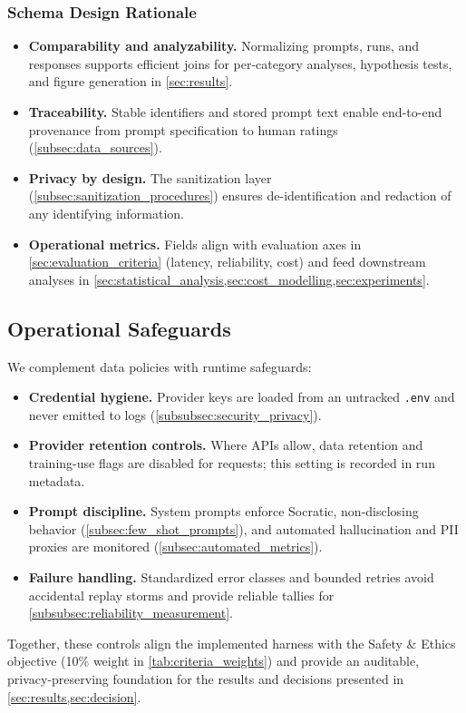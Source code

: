\subsubsection{Schema Design Rationale}\label{subsubsec:schema_rationale}

\begin{itemize}
\item \textbf{Comparability and analyzability.} Normalizing prompts, runs, and responses supports efficient joins for per-category analyses, hypothesis tests, and figure generation in \cref{sec:results}.
\item \textbf{Traceability.} Stable identifiers and stored prompt text enable end-to-end provenance from prompt specification to human ratings (\cref{subsec:data_sources}).
\item \textbf{Privacy by design.} The sanitization layer (\cref{subsec:sanitization_procedures}) ensures de-identification and redaction of any identifying information.
\item \textbf{Operational metrics.} Fields align with evaluation axes in \cref{sec:evaluation_criteria} (latency, reliability, cost) and feed downstream analyses in \cref{sec:statistical_analysis,sec:cost_modelling,sec:experiments}.
\end{itemize}

\subsection{Operational Safeguards}\label{subsec:operational_safeguards}

We complement data policies with runtime safeguards:

\begin{itemize}
\item \textbf{Credential hygiene.} Provider keys are loaded from an untracked \verb|.env| and never emitted to logs (\cref{subsubsec:security_privacy}).
\item \textbf{Provider retention controls.} Where APIs allow, data retention and training-use flags are disabled for requests; this setting is recorded in run metadata.
\item \textbf{Prompt discipline.} System prompts enforce Socratic, non-disclosing behavior (\cref{subsec:few_shot_prompts}), and automated hallucination and PII proxies are monitored (\cref{subsec:automated_metrics}).
\item \textbf{Failure handling.} Standardized error classes and bounded retries avoid accidental replay storms and provide reliable tallies for \cref{subsubsec:reliability_measurement}.
\end{itemize}

Together, these controls align the implemented harness with the Safety \& Ethics objective \big(10\% weight in \cref{tab:criteria_weights}\big) and provide an auditable, privacy-preserving foundation for the results and decisions presented in \cref{sec:results,sec:decision}.
